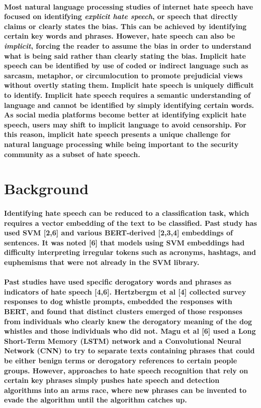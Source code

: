 \documentclass{article}
\begin{document}
\paragraph{Most natural language processing studies of internet hate speech have focused on identifying \textit{explicit hate speech}, or speech that directly claims or clearly states the bias. This can be achieved by identifying certain key words and phrases. However, hate speech can also be \textit{implicit}, forcing the reader to assume the bias in order to understand what is being said rather than clearly stating the bias. Implicit hate speech can be identified by use of coded or indirect language such as sarcasm, metaphor, or circumlocution to promote prejudicial views without overtly stating them. Implicit hate speech is uniquely difficult to identify. Implicit hate speech requires a semantic understanding of language and cannot be identified by simply identifying certain words. As social media platforms become better at identifying explicit hate speech, users may shift to implicit language to avoid censorship. For this reason, implicit hate speech presents a unique challenge for natural language processing while being important to the security community as a subset of hate speech.}
\section{Background}
\paragraph{Identifying hate speech can be reduced to a classification task, which requires a vector embedding of the text to be classified. Past study has used SVM [2,6] and various BERT-derived [2,3,4] embeddings of sentences. It was noted [6] that models using SVM embeddings had difficulty interpreting irregular tokens such as acronyms, hashtags, and euphemisms that were not already in the SVM library.}
\paragraph{Past studies have used specific derogatory words and phrases as indicators of hate speech [4,6]. Hertzbergm et al [4] collected survey responses to dog whistle prompts, embedded the responses with BERT, and found that distinct clusters emerged of those responses from individuals who clearly knew the derogatory meaning of the dog whistles and those individuals who did not. Magu et al [6] used a Long Short-Term Memory (LSTM) network and a Convolutional Neural Network (CNN) to try to separate texts containing phrases that could be either benign terms or derogatory references to certain people groups. However, approaches to hate speech recognition that rely on certain key phrases simply pushes hate speech and detection algorithms into an arms race, where new phrases can be invented to evade the algorithm until the algorithm catches up.}
\end{document}
